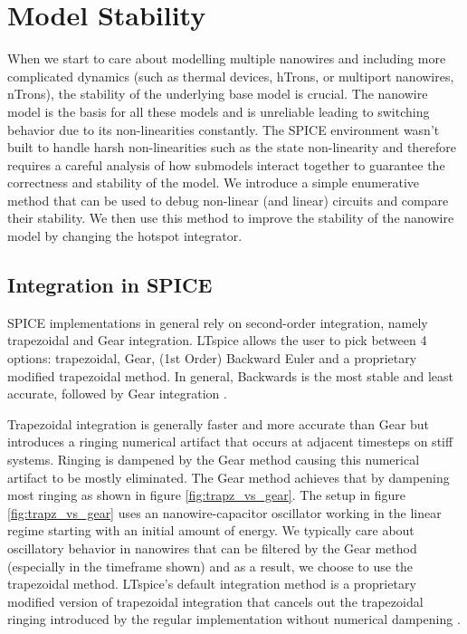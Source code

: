 \chapter{Model Stability} \label{stability}

When we start to care about modelling multiple nanowires and including more complicated dynamics
(such as thermal devices, hTrons, or multiport nanowires, nTrons), the stability of the underlying
base model is crucial. The nanowire model is the basis for all these models and is unreliable leading
to switching behavior due to its non-linearities constantly. The SPICE environment wasn't built to
handle harsh non-linearities such as the state non-linearity and therefore requires a careful
analysis of how submodels interact together to guarantee the correctness and stability of the model.
We introduce a simple enumerative method that can be used to debug non-linear (and linear) circuits
and compare their stability. We then use this method to improve the stability of the nanowire model
by changing the hotspot integrator.

\section{Integration in SPICE}

SPICE implementations in general rely on second-order integration, namely trapezoidal and Gear integration. LTspice allows the user to pick between 4 options: trapezoidal,
Gear, (1st Order) Backward Euler and a proprietary modified trapezoidal method. In general,
Backwards is the most stable and least accurate, followed by Gear integration 
\cite{ltspice-diff-post, spice-book}.

Trapezoidal integration is generally faster and more accurate than Gear but introduces a ringing
numerical artifact that occurs at adjacent timesteps on stiff systems. Ringing is dampened by the Gear
method causing this numerical artifact to be mostly eliminated. The Gear method achieves that by
dampening most ringing as shown in figure \ref{fig:trapz_vs_gear}. The setup in figure \ref{fig:trapz_vs_gear} uses an nanowire-capacitor oscillator working in the linear regime starting
with an initial amount of energy.
We typically care about oscillatory behavior in nanowires that can be filtered by the Gear
method (especially in the timeframe shown)
and as a result, we choose to use the trapezoidal method. LTspice's 
default integration method is a proprietary modified version of trapezoidal integration 
that cancels out the trapezoidal ringing introduced by the regular implementation without
numerical dampening \cite{ltspice-diff-post}. 

